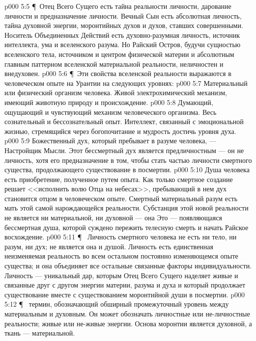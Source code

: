 \vs p000 5:5 \P\ Отец Всего Сущего есть тайна реальности личности, дарование личности и предназначение личности. Вечный Сын есть абсолютная личность, тайна духовной энергии, моронтийных духов и духов, ставших совершенными. Носитель Объединенных Действий есть духовно\hyp{}разумная личность, источник интеллекта, ума и вселенского разума. Но Райский Остров, будучи сущностью вселенского тела, источником и центром физической материи и абсолютным главным паттерном вселенской материальной реальности, неличностен и внедуховен.
\vs p000 5:6 \P\ Эти свойства вселенской реальности выражаются в человеческом опыте на Урантии на следующих уровнях:
\vs p000 5:7 \bibnobreakspace {} Материальный или физический организм человека. Живой электрохимический механизм, имеющий животную природу и происхождение.
\vs p000 5:8 \bibnobreakspace {} Думающий, ощущающий и чувствующий механизм человеческого организма. Весь сознательный и бессознательный опыт. Интеллект, связанный с эмоциональной жизнью, стремящийся через богопочитание и мудрость достичь уровня духа.
\vs p000 5:9 \bibnobreakspace {} Божественный дух, который пребывает в разуме человека, --- Настройщик Мысли. Этот бессмертный дух является предличностным --- он не личность, хотя его предназначение в том, чтобы стать частью личности смертного существа, продолжающего существование в посмертии.
\vs p000 5:10 \bibnobreakspace {} Душа человека есть приобретение, полученное путем опыта. Как только смертное создание решает <<исполнить волю Отца на небесах>>, пребывающий в нем дух становится отцом  в человеческом опыте. Смертный материальный разум есть мать этой самой нарождающейся реальности. Субстанция этой новой реальности не является ни материальной, ни духовной --- она  Это --- появляющаяся бессмертная душа, которой суждено пережить телесную смерть и начать Райское восхождение.
\vs p000 5:11 \P\  Личность смертного человека не есть ни тело, ни разум, ни дух; не является она и душой. Личность есть единственная неизменяемая реальность во всем остальном постоянно изменяющемся опыте существа; и она объединяет все остальные связанные факторы индивидуальности. Личность --- уникальный дар, которым Отец Всего Сущего наделяет живые и связанные друг с другом энергии материи, разума и духа и который продолжает существование вместе с существованием моронтийной души в посмертии.
\vs p000 5:12 \P\  термин, обозначающий обширный промежуточный уровень между материальным и духовным. Он может обозначать личностные или не\hyp{}личностные реальности; живые или не\hyp{}живые энергии. Основа моронтии является духовной, а ткань --- материальной.
